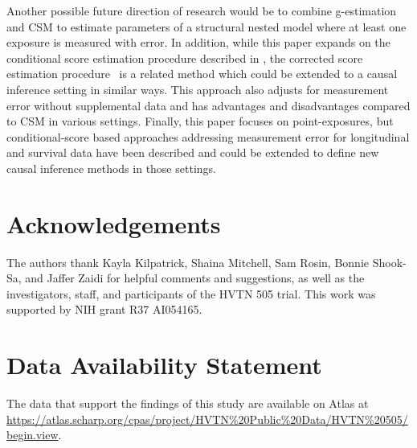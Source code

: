\documentclass[useAMS,usenatbib,referee]{biom}
\begin{document}
Another possible future direction of research would be to combine g-estimation and CSM to estimate parameters of a structural nested model where at least one exposure is measured with error. In addition, while this paper expands on the conditional score estimation procedure described in \citet{stefanski1987}, the corrected score estimation procedure~\citep{nakamura1990} is a related method which could be extended to a causal inference setting in similar ways. This approach also adjusts for measurement error without supplemental data and has advantages and disadvantages compared to CSM in various settings. Finally, this paper focuses on point-exposures, but conditional-score based approaches addressing measurement error for longitudinal and survival data have been described and could be extended to define new causal inference methods in those settings.





\backmatter


\section*{Acknowledgements}

The authors thank Kayla Kilpatrick, Shaina Mitchell, Sam Rosin, Bonnie Shook-Sa, and Jaffer Zaidi for helpful comments and suggestions, as well as the investigators, staff, and participants of the HVTN 505 trial. This work was supported by NIH grant R37 AI054165. \vspace*{-8pt}

\section*{Data Availability Statement}

The data that support the findings of this study are available on Atlas at \href{https://atlas.scharp.org/cpas/project/HVTN\%20Public\%20Data/HVTN\%20505/begin.view}{https://atlas.scharp.org/cpas/project/HVTN\%20Public\%20Data/HVTN\%20505/begin.view}.\vspace*{-8pt}
\end{document}
